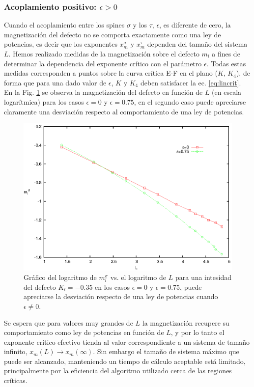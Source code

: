 \subsubsection{Acoplamiento positivo: $\epsilon>0$}

Cuando el acoplamiento entre los spines $\sigma$ y los $\tau$, $\epsilon$, es diferente de cero, la magnetización del defecto
 no se comporta exactamente como una ley de potencias, es decir que los exponentes $x_{m}^{\sigma}$ y $x_{m}^{\tau}$ dependen del
 tamaño del sistema $L$. Hemos realizado medidas de la magnetizaci\'on sobre el defecto $m_{l}$ a fines de determinar la dependencia del
 exponente cr\'itico con el par\'ametro $\epsilon$. Todas estas medidas corresponden a puntos sobre la curva cr\'itica E-F
 en el plano ($K$, $K_{4}$), de forma que para una dado valor de $\epsilon$, $K$ y $K_{4}$ deben satisfacer la ec. \ref{eq:lincrit}.
 En la Fig. \ref{fig:desv} se observa la magnetización del defecto en función de $L$ (en escala logar\'itmica) para los casos
 $\epsilon=0$ y $\epsilon=0.75$, en el segundo caso puede apreciarse claramente una desviación respecto al comportamiento de una ley de potencias.

\begin{figure}[h!]
\begin{center}
\includegraphics[width=\figwidth]{graf/exp/desv_e0.75_vs_e0.eps}
\end{center}
\caption{Gráfico del logaritmo de $m_{l}^{\sigma}$ vs. el logaritmo de $L$ para una intesidad del defecto $K_{l}=-0.35$ en
 los casos $\epsilon=0$ y $\epsilon=0.75$, puede apreciarse la desviación respecto de una ley de potencias cuando $\epsilon\neq 0$.}
\label{fig:desv}
\end{figure}
Se espera que para valores muy grandes de $L$ la magnetización recupere su comportamiento como ley de potencias en función
 de $L$, y por lo tanto el exponente crítico efectivo tienda al valor correspondiente a un sistema de tamaño infinito,
 $x_{m}(L)\rightarrow x_{m}(\infty)$. Sin embargo el tamaño de sistema m\'aximo que puede ser alcanzado, manteniendo un tiempo de c\'alculo
 aceptable est\'a limitado, principalmente por la eficiencia del algoritmo utilizado cerca de las regiones cr\'iticas.
 
